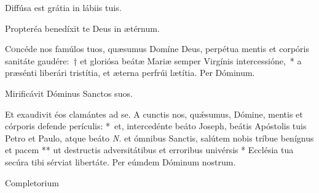 \documentclass[vesperale_romanum.tex]{subfiles}
\begin{document}

\vv Diffúsa est grátia in lábiis tuis.

\rr Propteréa benedíxit te Deus in ætérnum.

\label{an_beata_mater_in_sabbato_solesmes_1961}


\oratio \label{oratio_bmv}

\lettrine{C}{o}ncéde nos famúlos tuos, quæsumus Domíne Deus, perpétua mentis et corpóris sanitáte gaudére:~† et gloriósa beátæ Mariæ semper Virgínis intercessióne,~* a præsénti liberári tristítia, et æterna perfrúi lætítia. Per Dóminum.





\vv Mirificávit Dóminus Sanctos suos.

\rr Et exaudivit éos clamántes ad se.
%
\oratio
%
\lettrine{A}{} cun\-ctis nos, quǽsumus, Dómine, mentis et córporis defende perículis: \nolinebreak[4]*~et, intercedénte beáto Joseph, beátis Apóstolis tuis Petro et Paulo, atque beáto \textit{N.} et ómnibus Sanctis, salútem nobis tríbue benígnus et pacem ** ut destructis adversitátibus et erroribus univérsis * Ecclésia tua secúra tibi sérviat libertáte. Per eúmdem Dóminum nostrum.



Completorium  %

\end{document}
